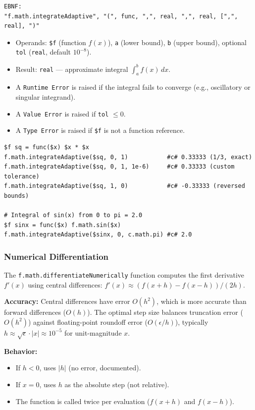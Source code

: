 \begin{verbatim}
EBNF:
"f.math.integrateAdaptive", "(", func, ",", real, ",", real, [",", real], ")"
\end{verbatim}
\begin{itemize}
\item Operands: \texttt{\$f} (function $f(x)$), \texttt{a} (lower bound), \texttt{b} (upper bound), optional \texttt{tol} (\texttt{real}, default $10^{-8}$).
\item Result: \texttt{real} --- approximate integral $\int_a^b f(x)\,dx$.
\item A \texttt{Runtime Error} is raised if the integral fails to converge (e.g., oscillatory or singular integrand).
\item A \texttt{Value Error} is raised if \texttt{tol} $\leq 0$.
\item A \texttt{Type Error} is raised if \texttt{\$f} is not a function reference.
\end{itemize}

\begin{verbatim}
$f sq = func($x) $x * $x
f.math.integrateAdaptive($sq, 0, 1)           #c# 0.33333 (1/3, exact)
f.math.integrateAdaptive($sq, 0, 1, 1e-6)     #c# 0.33333 (custom tolerance)
f.math.integrateAdaptive($sq, 1, 0)           #c# -0.33333 (reversed bounds)

# Integral of sin(x) from 0 to pi = 2.0
$f sinx = func($x) f.math.sin($x)
f.math.integrateAdaptive($sinx, 0, c.math.pi) #c# 2.0
\end{verbatim}

\subsubsection{Numerical Differentiation}
The \texttt{f.math.differentiateNumerically} function computes the first derivative $f'(x)$ using central differences: $f'(x) \approx (f(x+h) - f(x-h)) / (2h)$.

\textbf{Accuracy:} Central differences have error $O(h^2)$, which is more accurate than forward differences ($O(h)$). The optimal step size balances truncation error ($O(h^2)$) against floating-point roundoff error ($O(\epsilon/h)$), typically $h \approx \sqrt{\epsilon} \cdot |x| \approx 10^{-5}$ for unit-magnitude $x$.

\textbf{Behavior:}
\begin{itemize}
\item If $h < 0$, uses $|h|$ (no error, documented).
\item If $x = 0$, uses $h$ as the absolute step (not relative).
\item The function is called twice per evaluation ($f(x+h)$ and $f(x-h)$).
\end{itemize}

